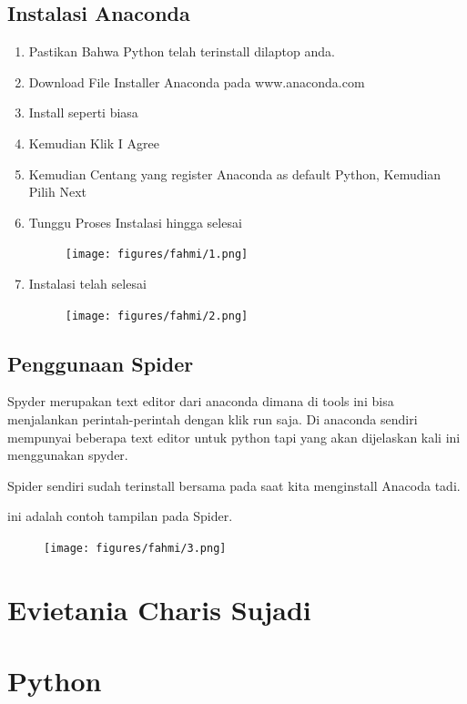 \subsection{Instalasi Anaconda}
\begin{enumerate}
    \item Pastikan Bahwa Python telah terinstall dilaptop anda.
    \item Download File Installer Anaconda pada www.anaconda.com
    \item Install seperti biasa
    \item Kemudian Klik I Agree
    \item Kemudian Centang yang register Anaconda as default Python, Kemudian Pilih Next
    \item Tunggu Proses Instalasi hingga selesai
    \begin{figure}[H]
		\texttt{[image: figures/fahmi/1.png]}
		\centering
	\end{figure}

    \item Instalasi telah selesai
	 \begin{figure}[H]
		\texttt{[image: figures/fahmi/2.png]}
		\centering
	\end{figure}
	
\end{enumerate}
	

\subsection{Penggunaan Spider}
Spyder merupakan text editor dari anaconda dimana di tools ini bisa menjalankan perintah-perintah dengan klik run saja.
Di anaconda sendiri mempunyai beberapa text editor untuk python tapi yang akan dijelaskan kali ini menggunakan spyder.

Spider sendiri sudah terinstall bersama pada saat kita menginstall Anacoda tadi.

ini adalah contoh tampilan pada Spider.
\begin{figure}[H]
		\texttt{[image: figures/fahmi/3.png]}
		\centering
	\end{figure}
\section{Evietania Charis Sujadi}

\section{Python}
